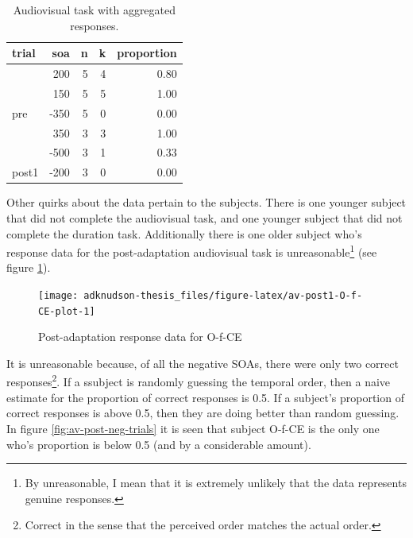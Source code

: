 \documentclass[11pt, oneside]{book}
\begin{document}
\begin{table}[!h]

\caption{\label{tab:av-bin-sample}Audiovisual task with aggregated responses.}
\centering
\begin{tabular}[t]{lrrrr}
\toprule
trial & soa & n & k & proportion\\
\midrule
 & 200 & 5 & 4 & 0.80\\
\cmidrule{2-5}
 & 150 & 5 & 5 & 1.00\\
\cmidrule{2-5}
\multirow[t]{-3}{*}{\raggedright\arraybackslash pre} & -350 & 5 & 0 & 0.00\\
\cmidrule{1-5}
 & 350 & 3 & 3 & 1.00\\
\cmidrule{2-5}
 & -500 & 3 & 1 & 0.33\\
\cmidrule{2-5}
\multirow[t]{-3}{*}{\raggedright\arraybackslash post1} & -200 & 3 & 0 & 0.00\\
\bottomrule
\end{tabular}
\end{table}

Other quirks about the data pertain to the subjects. There is one younger subject that did not complete the audiovisual task, and one younger subject that did not complete the duration task. Additionally there is one older subject who's response data for the post-adaptation audiovisual task is unreasonable\footnote{By unreasonable, I mean that it is extremely unlikely that the data represents genuine responses.} (see figure \ref{fig:av-post1-O-f-CE-plot}).

\begin{figure}

{\centering \texttt{[image: adknudson-thesis\_files/figure-latex/av-post1-O-f-CE-plot-1]} 

}

\caption{Post-adaptation response data for O-f-CE}\label{fig:av-post1-O-f-CE-plot}
\end{figure}

It is unreasonable because, of all the negative SOAs, there were only two correct responses\footnote{Correct in the sense that the perceived order matches the actual order.}. If a ssubject is randomly guessing the temporal order, then a naive estimate for the proportion of correct responses is 0.5. If a subject's proportion of correct responses is above 0.5, then they are doing better than random guessing. In figure \ref{fig:av-post-neg-trials} it is seen that subject O-f-CE is the only one who's proportion is below 0.5 (and by a considerable amount).
\end{document}
